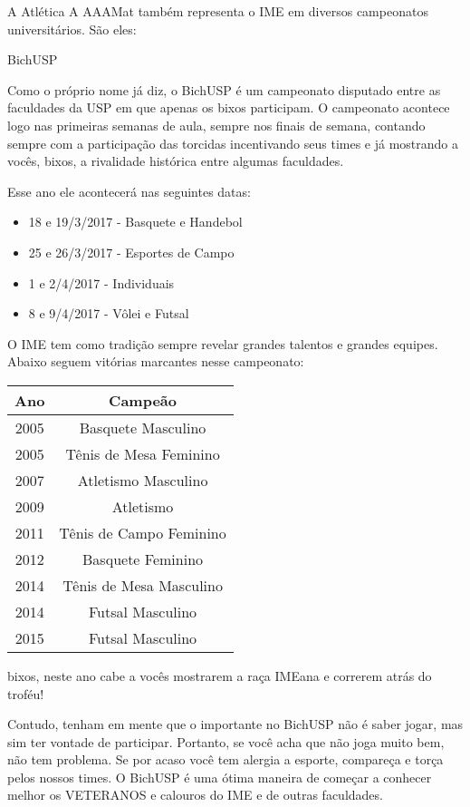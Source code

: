 \begin{secao}{A Atlética}
A AAAMat também representa o IME em diversos campeonatos universitários. São
eles:

\begin{subsecao}{BichUSP}

Como o próprio nome já diz, o BichUSP é um campeonato disputado entre as
faculdades da USP em que apenas os bixos participam. O campeonato acontece logo
nas primeiras semanas de aula, sempre nos finais de semana, contando sempre com
a participação das torcidas incentivando seus times e já mostrando a vocês, bixos,
a rivalidade histórica entre algumas faculdades.

Esse ano ele acontecerá nas seguintes datas:
\begin{itemize}
  \item 18 e 19/3/2017 - Basquete e Handebol
  \item 25 e 26/3/2017 - Esportes de Campo
  \item 1 e 2/4/2017 - Individuais
  \item 8 e 9/4/2017 - Vôlei e Futsal
\end{itemize}

O IME tem como tradição sempre revelar grandes talentos e grandes equipes.
Abaixo seguem vitórias marcantes nesse campeonato:

\begin{center}
	\begin{tabular}{c|c}
	  \hline
	  Ano & Campeão\\
	  \hline
	  2005 & Basquete Masculino \\
	  2005 & Tênis de Mesa Feminino \\
	  2007 & Atletismo Masculino\\
	  2009 & Atletismo\\
	  2011 & Tênis de Campo Feminino\\
	  2012 & Basquete Feminino\\
	  2014 & Tênis de Mesa Masculino\\
	  2014 & Futsal Masculino\\
	  2015 & Futsal Masculino\\
 	  \hline
	\end{tabular}
\end{center}


bixos, neste ano cabe a vocês mostrarem a raça IMEana e correrem atrás do
troféu!

Contudo, tenham em mente que o importante no BichUSP não é saber jogar, mas sim
ter vontade de participar.  Portanto, se você acha que não joga muito bem, não
tem problema. Se por acaso você tem alergia a esporte, compareça e torça pelos
nossos times. O BichUSP é uma ótima maneira de começar a conhecer melhor os
VETERANOS e calouros do IME e de outras faculdades.


\end{subsecao}
\end{secao}
